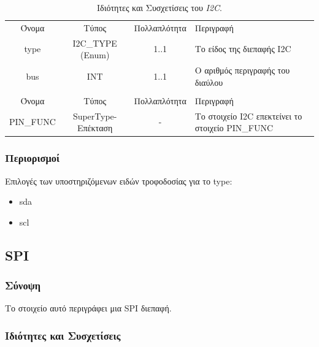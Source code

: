 \begin{table}[H]
	\begin{center}
		\begin{tabular}{ | c | c | c| m{5.5cm} | }
			\hline
			\rowcolor{Gray}
			\multicolumn{4}{|c|}{\textbf{Ιδιότητες}}\\
			\hline
			\rowcolor{Gray}
			Όνομα & Τύπος & Πολλαπλότητα & Περιγραφή \\
			\hline
			type & I2C\_TYPE (Enum) & 1..1 & Το είδος της διεπαφής I2C \\
			\hline
			bus & INT & 1..1 & Ο αριθμός περιγραφής του διαύλου \\
			\hline
			\rowcolor{Gray}
			\multicolumn{4}{|c|}{\textbf{Συσχετίσεις}}\\
			\hline
			\rowcolor{Gray}
			Όνομα & Τύπος & Πολλαπλότητα & Περιγραφή \\
			\hline
			PIN\_FUNC & SuperType-Επέκταση & - &  Το στοιχείο I2C επεκτείνει το στοιχείο PIN\_FUNC \\
			\hline
		\end{tabular}
		\caption{Ιδιότητες και Συσχετίσεις του \textit{I2C}.}
		\label{tab:i2c}
	\end{center}
\end{table}

\subsubsection*{Περιορισμοί}

\noindent Επιλογές των υποστηριζόμενων ειδών τροφοδοσίας για το type:

\begin{itemize}
	\item sda
	\item scl
\end{itemize}

\subsection{SPI}
\label{subsec:spi}

\subsubsection*{Σύνοψη}

\noindent Το στοιχείο αυτό περιγράφει μια SPI διεπαφή.

\subsubsection*{Ιδιότητες και Συσχετίσεις}

